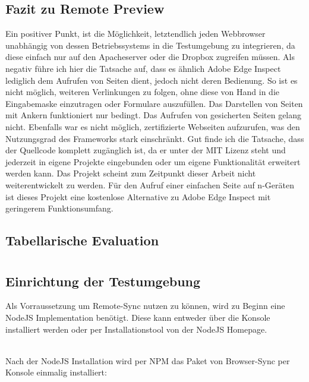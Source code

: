 		\subsection{Fazit zu Remote Preview}
		Ein positiver Punkt, ist die Möglichkeit, letztendlich jeden \Gls{Webbrowser} unabhängig von dessen Betriebssystems in die 				Testumgebung zu integrieren, da diese einfach nur auf den \Gls{Apache}server oder die Dropbox zugreifen müssen. Als negativ führe ich hier die Tatsache auf, dass es ähnlich Adobe Edge Inspect lediglich dem Aufrufen von Seiten dient, jedoch nicht deren Bedienung. So ist es nicht möglich, weiteren Verlinkungen zu folgen, ohne diese von Hand in die Eingabemaske einzutragen oder Formulare auszufüllen. Das Darstellen von Seiten mit \Gls{Anker}n funktioniert nur bedingt. Das Aufrufen von \gls{gesichert}en Seiten gelang nicht. Ebenfalls war es nicht möglich, zertifizierte Webseiten aufzurufen, was den Nutzungsgrad des \Gls{Framework}s stark einschränkt. Gut finde ich die Tatsache, dass der Quellcode komplett zugänglich ist, da er unter der MIT Lizenz steht und jederzeit in eigene Projekte eingebunden oder um eigene Funktionalität erweitert werden kann. Das Projekt scheint zum Zeitpunkt dieser Arbeit nicht weiterentwickelt zu werden. Für den Aufruf einer einfachen Seite auf n-Geräten ist dieses Projekt eine kostenlose Alternative zu Adobe Edge Inspect mit geringerem Funktionsumfang.
		
				
		\subsection{Tabellarische Evaluation}
		
	
\pagebreak
	\section{}	
	\subsection{Einrichtung der Testumgebung}
	Als Vorraussetzung um Remote-Sync nutzen zu können, wird zu Beginn eine \mbox{\gls{NodeJS}} Implementation benötigt. Diese kann entweder über die Konsole installiert werden oder per Installationstool von der \gls{NodeJS} Homepage.
	
	\\Nach der \gls{NodeJS} Installation wird per \Gls{NPM} das Paket von Browser-Sync per Konsole einmalig installiert:
	
